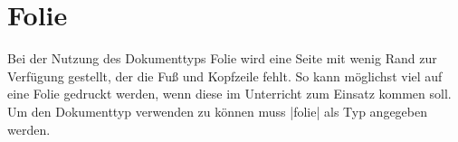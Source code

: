 \section{Folie}
\label{typ:folie}
Bei der Nutzung des Dokumenttyps Folie wird eine Seite mit wenig Rand zur Verfügung gestellt, der die Fuß und Kopfzeile fehlt. So kann möglichst viel auf eine Folie gedruckt werden, wenn diese im Unterricht zum Einsatz kommen soll. Um den Dokumenttyp verwenden zu können muss \verbcode|folie| als Typ angegeben werden.

%\subsection{Paketoptionen}

